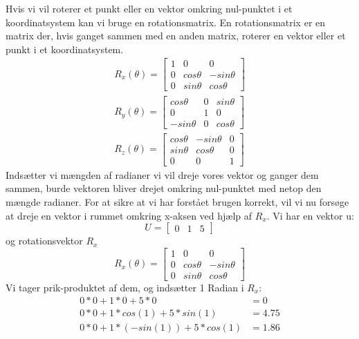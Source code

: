 Hvis vi vil roterer et punkt eller en vektor omkring nul-punktet i et koordinatsystem kan vi bruge en rotationsmatrix\cite{rotationsmatricer}.
En rotationsmatrix er en matrix der, hvis ganget sammen med en anden matrix, roterer en vektor eller et punkt i et koordinatsystem.
\begin{align}\label{eu_eqn}
R_x(\theta) = 
\begin{bmatrix}
1 & 0 & 0\\ 
0 & cos \theta & - sin \theta\\ 
0 & sin \theta & cos \theta
\end{bmatrix}\\
R_y(\theta) = 
\begin{bmatrix}
cos \theta  & 0 & sin \theta\\ 
0           & 1 & 0\\ 
-sin \theta & 0 & cos \theta
\end{bmatrix}\\
R_z(\theta) = 
\begin{bmatrix}
cos \theta & - sin \theta & 0\\ 
sin \theta & cos \theta & 0\\
0 & 0 & 1
\end{bmatrix}
\end{align}
Indsætter vi mængden af radianer vi vil dreje vores vektor og ganger dem sammen, burde vektoren bliver drejet omkring nul-punktet med netop den mængde radianer.
For at sikre at vi har forstået brugen korrekt, vil vi nu forsøge at dreje en vektor i rummet omkring x-aksen ved hjælp af $R_x$. 
Vi har en vektor u:
\begin{equation}
		U=
	\begin{bmatrix}
		0 & 1 & 5
	\end{bmatrix}
\end{equation}
og rotationsvektor \begin{math}R_x\end{math}
\begin{equation}
		R_x(\theta) = 
	\begin{bmatrix}
		1 & 0 & 0\\ 
		0 & cos \theta & - sin \theta\\ 
		0 & sin \theta & cos \theta
	\end{bmatrix}
\end{equation}
Vi tager prik-produktet af dem, og indsætter 1 Radian i $R_x$:
\begin{equation}
	\begin{align}
		0*0+1*0+5*0&=0\\
		0*0+1*cos(1)+5*sin(1)&=4.75\\
		0*0+1*(-sin(1))+5*cos(1)&=1.86
	\end{align}
\end{equation}
